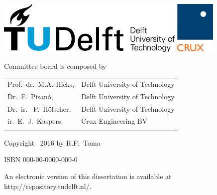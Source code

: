 \documentclass[11pt,a4paper]{report}
\begin{document}
\begin{titlepage}
		\vspace*{12cm}
		\begin{center}
			\includegraphics[height=1in]{"TUDLogo"}
			\hspace{2em}
			\includegraphics[height=1in]{"CRUXlogo"} \\
	
		\end{center}
		\vfill
		\noindent Committee board is composed by
		
		
		\begin{tabular}{p{5cm}l}
			Prof.\ dr.\ M.A. Hicks, & Delft University of Technology \\
			Dr.\ F.\ Pisan\`{o}, & Delft University of Technology \\
			Dr.\ ir. \ P.\ H\"{o}lscher, & Delft University of Technology \\
			ir.\ E.\ J.\ Kaspers, & Crux Engineering BV\\
			
			\medskip
		
	\end{tabular}
		
		\vspace{4\bigskipamount}
		
		\noindent Copyright \textcopyright\ 2016 by R.F.~Toma
		
		
		\medskip
		\noindent ISBN 000-00-0000-000-0
		
		\medskip
		\noindent An electronic version of this dissertation is available at \\
		{http://repository.tudelft.nl/}.
		
	\end{titlepage}
	
\end{document}
